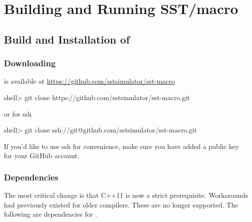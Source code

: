 
\chapter{Building and Running SST/macro}
\label{chapter:building}

\section{Build and Installation of \sstmacro}
\label{sec:buildinstall}


\subsection{Downloading}
\label{subsec:build:downloading}

\sstmacro is available at \url{https://github.com/sstsimulator/sst-macro}

\begin{ShellCmd}
shell> git clone https://github.com/sstsimulator/sst-macro.git 
\end{ShellCmd}
or for ssh

\begin{ShellCmd}
shell> git clone ssh://git@github.com/sstsimulator/sst-macro.git 
\end{ShellCmd}


If you'd like to use ssh for convenience, make sure you have added a public key for your GitHub account.

\subsection{Dependencies}
\label{subsec:build:dependencies}
The most critical change is that C++11 is now a strict prerequisite. 
Workarounds had previously existed for older compilers. 
These are no longer supported.
The following are dependencies for \sstmacro.

